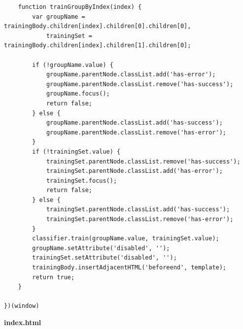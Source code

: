 \documentclass[14pt,a4paper]{extreport}
\begin{document}
\begin{verbatim}
	function trainGroupByIndex(index) {
		var groupName = trainingBody.children[index].children[0].children[0],
			trainingSet = trainingBody.children[index].children[1].children[0];

		if (!groupName.value) {
			groupName.parentNode.classList.add('has-error');
			groupName.parentNode.classList.remove('has-success');
			groupName.focus();
			return false;
		} else {
			groupName.parentNode.classList.add('has-success');
			groupName.parentNode.classList.remove('has-error');
		}
		if (!trainingSet.value) {
			trainingSet.parentNode.classList.remove('has-success');
			trainingSet.parentNode.classList.add('has-error');
			trainingSet.focus();
			return false;
		} else {
			trainingSet.parentNode.classList.add('has-success');
			trainingSet.parentNode.classList.remove('has-error');
		}
		classifier.train(groupName.value, trainingSet.value);
		groupName.setAttribute('disabled', '');
		trainingSet.setAttribute('disabled', '');
		trainingBody.insertAdjacentHTML('beforeend', template);
		return true;
	}

})(window)
    \end{verbatim}
	\par \textbf{index.html}
\end{document}
